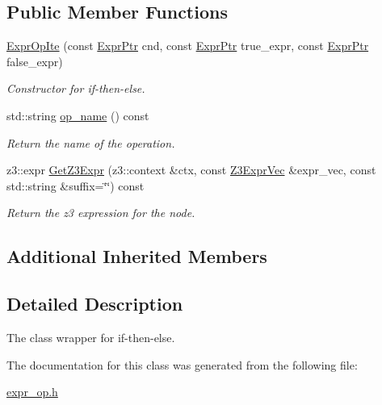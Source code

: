 \subsection*{Public Member Functions}
\begin{DoxyCompactItemize}
\item 
\mbox{\label{classilang_1_1_expr_op_ite_a4915f10265fdb7769936d5798d35756a}} 
\mbox{\hyperlink{classilang_1_1_expr_op_ite_a4915f10265fdb7769936d5798d35756a}{Expr\+Op\+Ite}} (const \mbox{\hyperlink{classilang_1_1_expr_a85952b6a34620c4c8cab6bac9c9fdf8c}{Expr\+Ptr}} cnd, const \mbox{\hyperlink{classilang_1_1_expr_a85952b6a34620c4c8cab6bac9c9fdf8c}{Expr\+Ptr}} true\+\_\+expr, const \mbox{\hyperlink{classilang_1_1_expr_a85952b6a34620c4c8cab6bac9c9fdf8c}{Expr\+Ptr}} false\+\_\+expr)
\begin{DoxyCompactList}\small\item\em Constructor for if-\/then-\/else. \end{DoxyCompactList}\item 
\mbox{\label{classilang_1_1_expr_op_ite_a921c2374235cc5549010ee2cf811df21}} 
std\+::string \mbox{\hyperlink{classilang_1_1_expr_op_ite_a921c2374235cc5549010ee2cf811df21}{op\+\_\+name}} () const
\begin{DoxyCompactList}\small\item\em Return the name of the operation. \end{DoxyCompactList}\item 
\mbox{\label{classilang_1_1_expr_op_ite_a006b51a49846e82b677131d4d482b4e3}} 
z3\+::expr \mbox{\hyperlink{classilang_1_1_expr_op_ite_a006b51a49846e82b677131d4d482b4e3}{Get\+Z3\+Expr}} (z3\+::context \&ctx, const \mbox{\hyperlink{namespaceilang_adc4eee919aa24fff882d03a48d733c19}{Z3\+Expr\+Vec}} \&expr\+\_\+vec, const std\+::string \&suffix=\char`\"{}\char`\"{}) const
\begin{DoxyCompactList}\small\item\em Return the z3 expression for the node. \end{DoxyCompactList}\end{DoxyCompactItemize}
\subsection*{Additional Inherited Members}


\subsection{Detailed Description}
The class wrapper for if-\/then-\/else. 

The documentation for this class was generated from the following file\+:\begin{DoxyCompactItemize}
\item 
\mbox{\hyperlink{expr__op_8h}{expr\+\_\+op.\+h}}\end{DoxyCompactItemize}
